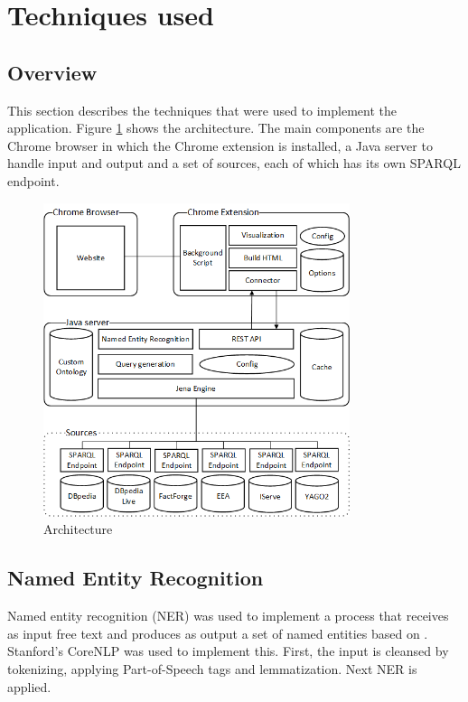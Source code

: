 \section{Techniques used} 

\subsection{Overview}
This section describes the techniques that were used to implement the application. Figure \ref{fig:architecture} shows the architecture. The main components are the Chrome browser in which the Chrome extension is installed, a Java server to handle input and output and a set of sources, each of which has its own SPARQL endpoint. 


\begin{figure}[ht]
	\centering
	\includegraphics[width=0.8\textwidth]{img/Architecture_v2}
	\caption{Architecture}
	\label{fig:architecture}
\end{figure}


%


\subsection{Named Entity Recognition}
Named entity recognition (NER) was used to implement a process that receives as input free text and produces as output a set of named entities based on \cite{NERTutorial}. Stanford's CoreNLP \cite{CoreNLP_NER} was used to implement this. First, the input is cleansed by tokenizing, applying Part-of-Speech tags and lemmatization. Next NER is applied. 

